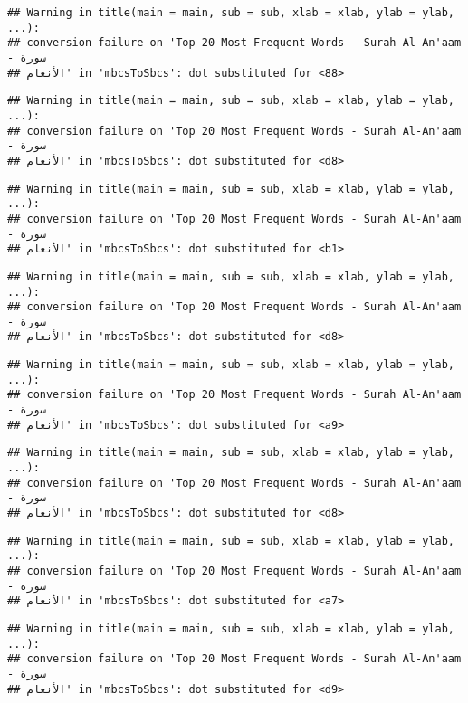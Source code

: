 \documentclass[]{article}
\begin{document}
\begin{verbatim}
## Warning in title(main = main, sub = sub, xlab = xlab, ylab = ylab, ...):
## conversion failure on 'Top 20 Most Frequent Words - Surah Al-An'aam - سورة
## الأنعام' in 'mbcsToSbcs': dot substituted for <88>
\end{verbatim}

\begin{verbatim}
## Warning in title(main = main, sub = sub, xlab = xlab, ylab = ylab, ...):
## conversion failure on 'Top 20 Most Frequent Words - Surah Al-An'aam - سورة
## الأنعام' in 'mbcsToSbcs': dot substituted for <d8>
\end{verbatim}

\begin{verbatim}
## Warning in title(main = main, sub = sub, xlab = xlab, ylab = ylab, ...):
## conversion failure on 'Top 20 Most Frequent Words - Surah Al-An'aam - سورة
## الأنعام' in 'mbcsToSbcs': dot substituted for <b1>
\end{verbatim}

\begin{verbatim}
## Warning in title(main = main, sub = sub, xlab = xlab, ylab = ylab, ...):
## conversion failure on 'Top 20 Most Frequent Words - Surah Al-An'aam - سورة
## الأنعام' in 'mbcsToSbcs': dot substituted for <d8>
\end{verbatim}

\begin{verbatim}
## Warning in title(main = main, sub = sub, xlab = xlab, ylab = ylab, ...):
## conversion failure on 'Top 20 Most Frequent Words - Surah Al-An'aam - سورة
## الأنعام' in 'mbcsToSbcs': dot substituted for <a9>
\end{verbatim}

\begin{verbatim}
## Warning in title(main = main, sub = sub, xlab = xlab, ylab = ylab, ...):
## conversion failure on 'Top 20 Most Frequent Words - Surah Al-An'aam - سورة
## الأنعام' in 'mbcsToSbcs': dot substituted for <d8>
\end{verbatim}

\begin{verbatim}
## Warning in title(main = main, sub = sub, xlab = xlab, ylab = ylab, ...):
## conversion failure on 'Top 20 Most Frequent Words - Surah Al-An'aam - سورة
## الأنعام' in 'mbcsToSbcs': dot substituted for <a7>
\end{verbatim}

\begin{verbatim}
## Warning in title(main = main, sub = sub, xlab = xlab, ylab = ylab, ...):
## conversion failure on 'Top 20 Most Frequent Words - Surah Al-An'aam - سورة
## الأنعام' in 'mbcsToSbcs': dot substituted for <d9>
\end{verbatim}
\end{document}
